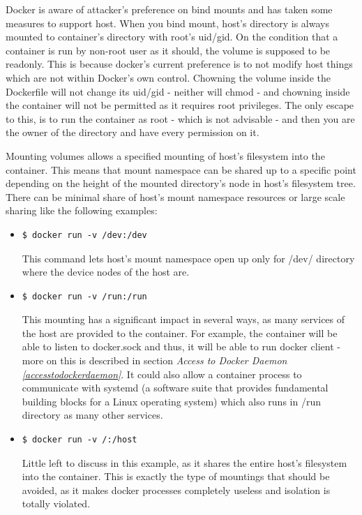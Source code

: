 Docker is aware of attacker's preference on bind mounts and has taken some measures to support host. When you bind mount, host's directory is always mounted to container's directory with root's uid/gid. On the condition that a container is run by non-root user as it should, the volume is supposed to be readonly. This is because docker's current preference is to not modify host things which are not within Docker's own control. Chowning the volume inside the Dockerfile will not change its uid/gid - neither will chmod - and chowning inside the container will not be permitted as it requires root privileges. The only escape to this, is to run the container as root - which is not advisable - and then you are the owner of the directory and have every permission on it.

Mounting volumes allows a specified mounting of host's filesystem into the container. This means that mount namespace can be shared up to a specific point depending on the height of the mounted directory's node in host's filesystem tree.
There can be minimal share of host's mount namespace resources or large scale sharing like the following examples:

\begin{itemize}
\item \begin{lstlisting}[style=dockercommands]
$ docker run -v /dev:/dev
\end{lstlisting}
This command lets host's mount namespace open up only for /dev/ directory where the device nodes of the host are.

\item \begin{lstlisting}[style=dockercommands]
$ docker run -v /run:/run
\end{lstlisting}
This mounting has a significant impact in several ways, as many services of the host are provided to the container. For example, the container will be able to listen to docker.sock and thus, it will be able to run docker client - more on this is described in section \textit{Access to Docker Daemon \ref{accesstodockerdaemon}}. It could also allow a container process to communicate with systemd (a software suite that provides fundamental building blocks for a Linux operating system) which also runs in /run directory as many other services.

\item \begin{lstlisting}[style=dockercommands]
$ docker run -v /:/host
\end{lstlisting}
Little left to discuss in this example, as it shares the entire host's filesystem into the container. This is exactly the type of mountings that should be avoided, as it makes docker processes completely useless and isolation is totally violated.
\end{itemize}

